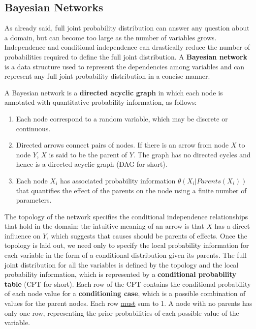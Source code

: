 \documentclass{article}
\begin{document}
\subsection{Bayesian Networks}
As already said, full joint probability distribution can answer any question about a domain, but can become too large as the number of variables grows. Independence and conditional independence can drastically reduce the number of probabilities required to define the full joint distribution. A \textbf{Bayesian network} is a data structure used to represent the dependencies among variables and can represent any full joint probability distribution in a concise manner. 

A Bayesian network is a \textbf{directed acyclic graph} in which each node is annotated with quantitative probability information, as follows:
\begin{enumerate}
    \item Each node correspond to a random variable, which may be discrete or continuous.
    \item Directed arrows connect pairs of nodes. If there is an arrow from node $X$ to node $Y$, $X$ is said to be the parent of $Y$. The graph has no directed cycles and hence is a directed acyclic graph (DAG for short).
    \item Each node $X_i$ has associated probability information $\theta(X_i|Parents(X_i))$ that quantifies the effect of the parents on the node using a finite number of parameters. 
\end{enumerate}

The topology of the network specifies the conditional independence relationships that hold in the domain: the intuitive meaning of an arrow is that $X$ has a direct influence on $Y$, which suggests that causes should be parents of effects. Once the topology is laid out, we need only to specify the local probability information for each variable in the form of a conditional distribution given its parents. The full joint distribution for all the variables is defined by the topology and the local probability information, which is represented by a \textbf{conditional probability table} (CPT for short). Each row of the CPT contains the conditional probability of each node value for a \textbf{conditioning case}, which is a possible combination of values for the parent nodes. Each row \underline{must} sum to 1. A node with no parents has only one row, representing the prior probabilities of each possible value of the variable.
\end{document}
